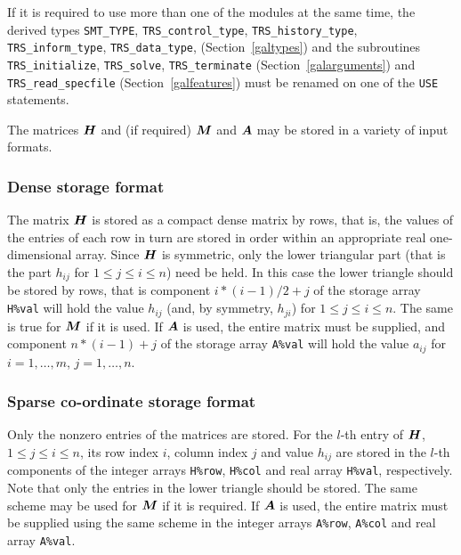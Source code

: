 \documentclass{galahad}
\newcommand{\packagename}{TRS}
\begin{document}
\noindent
If it is required to use more than one of the modules at the same time, 
the derived types
{\tt SMT\_TYPE},
{\tt \packagename\_control\_type},
{\tt \packagename\_history\_\-type},
{\tt \packagename\_inform\_type},
{\tt \packagename\_data\_type},
(Section~\ref{galtypes})
and the subroutines
{\tt \packagename\_initialize},
{\tt \packagename\_solve}, {\tt \packagename\_\-terminate}
(Section~\ref{galarguments})
and
{\tt \packagename\_read\_specfile}
(Section~\ref{galfeatures})
must be renamed on one of the {\tt USE} statements.


\galmatrix
The matrices ${\bm{H}}$ and (if required) ${\bm{M}}$ and ${\bm{A}}$
may be stored in a variety of input formats.

\subsubsection{Dense storage format}\label{dense}
The matrix ${\bm{H}}$ is stored as a compact
dense matrix by rows, that is, the values of the entries of each row in turn are
stored in order within an appropriate real one-dimensional array.
Since ${\bm{H}}$ is symmetric, only the lower triangular part (that is the part
$h_{ij}$ for $1 \leq j \leq i \leq n$) need be held. In this case
the lower triangle should be stored by rows, that is
component $i \ast (i-1)/2 + j$ of the storage array {\tt H\%val}
will hold the value $h_{ij}$ (and, by symmetry, $h_{ji}$)
for $1 \leq j \leq i \leq n$. The same is true for ${\bm{M}}$ if it is used.
If ${\bm{A}}$ is used, the entire matrix must be supplied, and
component $n \ast (i-1) + j$ of the storage array {\tt A\%val} will hold the
value $a_{ij}$ for $i = 1, \ldots , m$, $j = 1, \ldots , n$.

\subsubsection{Sparse co-ordinate storage format}\label{coordinate}
Only the nonzero entries of the matrices are stored.
For the $l$-th entry of ${\bm{H}}$, $1 \leq j \leq i \leq n$,
its row index $i$, column index $j$ and value $h_{ij}$
are stored in the $l$-th components of the integer arrays {\tt H\%row},
{\tt H\%col} and real array {\tt H\%val}, respectively.
Note that only the entries in the lower triangle should be stored.
The same scheme may be used for ${\bm{M}}$ if it is required.
If ${\bm{A}}$ is used, the entire matrix must be supplied using the same scheme
in the integer arrays {\tt A\%row}, {\tt A\%col} and real array {\tt A\%val}.
\end{document}
